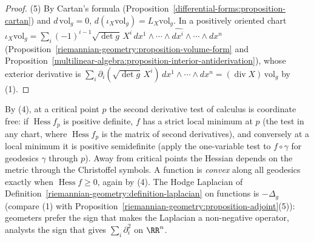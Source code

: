 \begin{proof}
(5) By Cartan's formula (Proposition~\ref{differential-forms:proposition-cartan}) and $d\,\mathrm{vol}_g = 0$, $d(\iota_X\mathrm{vol}_g) = L_X\mathrm{vol}_g$. In a positively oriented chart
$\iota_X\mathrm{vol}_g = \sum_i(-1)^{i-1}\sqrt{\det g}\,X^i\,dx^1 \wedge \cdots \wedge \widehat{dx^i} \wedge \cdots \wedge dx^n$ (Proposition~\ref{riemannian-geometry:proposition-volume-form} and
Proposition~\ref{multilinear-algebra:proposition-interior-antiderivation}), whose exterior derivative is $\sum_i\partial_i(\sqrt{\det g}\,X^i)\,dx^1 \wedge \cdots \wedge dx^n = (\operatorname{div}X)\,\mathrm{vol}_g$ by (1).
\end{proof}

By (4), at a critical point $p$ the second derivative test of calculus is coordinate free: if $\operatorname{Hess}f_p$ is positive definite, $f$ has a strict local minimum at $p$ (the test in any
chart, where $\operatorname{Hess}f_p$ is the matrix of second derivatives), and conversely at a local minimum it is positive semidefinite (apply the one-variable test to $f \circ \gamma$ for geodesics $\gamma$
through $p$). Away from critical points the Hessian depends on the metric through the Christoffel
symbols. A function is \emph{convex} along all geodesics exactly when $\operatorname{Hess}f \geq 0$, again by (4). The Hodge Laplacian of Definition~\ref{riemannian-geometry:definition-laplacian} on functions is
$-\Delta_g$ (compare (1) with Proposition~\ref{riemannian-geometry:proposition-adjoint}(5)): geometers prefer the sign that makes the Laplacian a non-negative operator, analysts the sign that gives $\sum_i\partial_i^2$ on
$\RR^n$.

